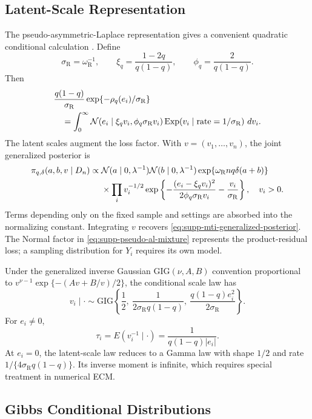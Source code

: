 \documentclass[11pt]{article}
\newcommand{\Normal}{\mathcal{N}}
\newcommand{\Exp}{\mathrm{Exp}}
\newcommand{\GIG}{\mathrm{GIG}}
\begin{document}
\subsection{Latent-Scale Representation}

The pseudo-asymmetric-Laplace representation gives a convenient quadratic
conditional calculation \citep{KozumiKobayashi2011Gibbs}. Define
\[
\sigma_{\mathrm R}=\omega_{\mathrm R}^{-1},\qquad
\xi_q=\frac{1-2q}{q(1-q)},\qquad
\phi_q=\frac{2}{q(1-q)}.
\]
Then
\begin{align}
&\frac{q(1-q)}{\sigma_{\mathrm R}}
\exp\{-\rho_q(e_i)/\sigma_{\mathrm R}\}\notag\\
&\quad=\int_0^\infty
\Normal\!\left(e_i\mid\xi_qv_i,\phi_q\sigma_{\mathrm R}v_i\right)
\Exp\!\left(v_i\mid\mathrm{rate}=1/\sigma_{\mathrm R}\right)\,dv_i.
\label{eq:supp-pseudo-al-mixture}
\end{align}
The latent scales augment the loss factor. With
\(v=(v_1,\ldots,v_n)\), the joint generalized posterior is
\begin{align}
\pi_{q,\delta}(a,b,v\mid D_n)\propto{}&
\Normal(a\mid0,\lambda^{-1})\Normal(b\mid0,\lambda^{-1})
\exp\{\omega_{\mathrm R}nq\delta(a+b)\}\notag\\
&\times\prod_i v_i^{-1/2}
\exp\left\{-\frac{(e_i-\xi_qv_i)^2}{2\phi_q\sigma_{\mathrm R}v_i}
-\frac{v_i}{\sigma_{\mathrm R}}\right\},\quad v_i>0.
\label{eq:supp-mti-augmented-posterior}
\end{align}
Terms depending only on the fixed sample and settings are absorbed into the
normalizing constant. Integrating \(v\) recovers
\eqref{eq:supp-mti-generalized-posterior}. The Normal factor in
\eqref{eq:supp-pseudo-al-mixture} represents the product-residual loss; a
sampling distribution for \(Y_i\) requires its own model.

Under the generalized inverse Gaussian \(\GIG(\nu,A,B)\) convention proportional to
\(v^{\nu-1}\exp\{-(Av+B/v)/2\}\), the conditional scale law has
\[
v_i\mid\cdot\sim
\GIG\left\{
\frac12,\
\frac{1}{2\sigma_{\mathrm R}q(1-q)},\
\frac{q(1-q)e_i^2}{2\sigma_{\mathrm R}}
\right\}.
\]
For \(e_i\ne0\),
\[
\tau_i=E(v_i^{-1}\mid\cdot)=\frac{1}{q(1-q)|e_i|}.
\]
At \(e_i=0\), the latent-scale law reduces to a Gamma law with shape
\(1/2\) and rate \(1/\{4\sigma_{\mathrm R}q(1-q)\}\). Its inverse moment
is infinite, which requires special treatment in numerical ECM.

\subsection{Gibbs Conditional Distributions}
\label{sec:supp-mti-gibbs}
\end{document}
